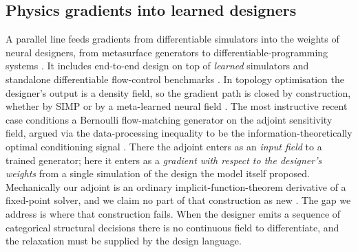 \subsection{Physics gradients into learned designers}
\label{sec:rw-designers}
A parallel line feeds gradients from differentiable simulators into the weights
of neural designers, from metasurface generators to differentiable-programming
systems \cite{jiang2019glonet,hu2020difftaichi,um2020solver,holl2020learning}. It includes end-to-end design on
top of \emph{learned} simulators \cite{allen2022physicaldesign,raissi2019pinn} and
standalone differentiable flow-control benchmarks \cite{fluidgym2026}.  In
topology optimisation the designer's
output is a density field, so the gradient path is closed by construction,
whether by SIMP or by a meta-learned neural field
\cite{bendsoe1989simp}.  The most instructive recent case
conditions a Bernoulli flow-matching generator on the adjoint sensitivity field,
argued via the data-processing inequality to be the information-theoretically
optimal conditioning signal \cite{topotransformer2026}.  There the adjoint
enters as an \emph{input field} to a trained generator; here it enters as a
\emph{gradient with respect to the designer's weights} from a single simulation
of the design the model itself proposed.  Mechanically our adjoint is an
ordinary implicit-function-theorem derivative of a fixed-point solver, and we
claim no part of that construction as new
\cite{giles2000adjoint,lorraine2020implicit,knoll2004jfnk}.  The gap we address
is where that construction fails. When the designer emits a sequence of
categorical structural decisions there is no continuous field to differentiate,
and the relaxation must be supplied by the design language.

